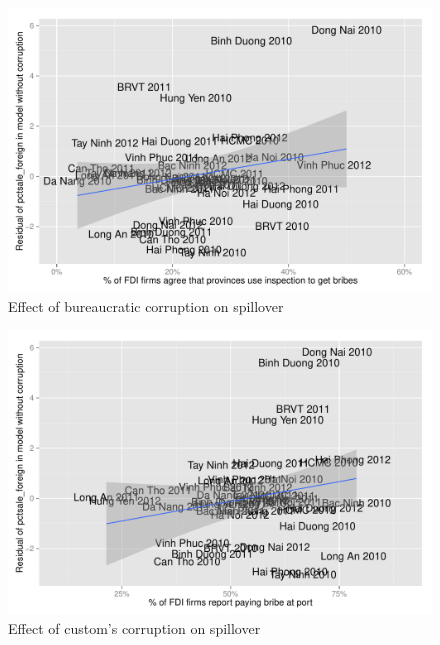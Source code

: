\documentclass[12pt]{article}
\begin{document}
\begin{figure}[!ht]
\centering
\includegraphics[width=\textwidth, height=\textheight,keepaspectratio]{../figure/bureaucratic_rents_residual}
\caption{Effect of bureaucratic corruption on spillover}
\end{figure}

\begin{figure}[!ht]
\centering
\includegraphics[width=\textwidth, height=\textheight,keepaspectratio]{../figure/custom_corrupt_residual}
\caption{Effect of custom's corruption on spillover}
\end{figure}
\end{document}
